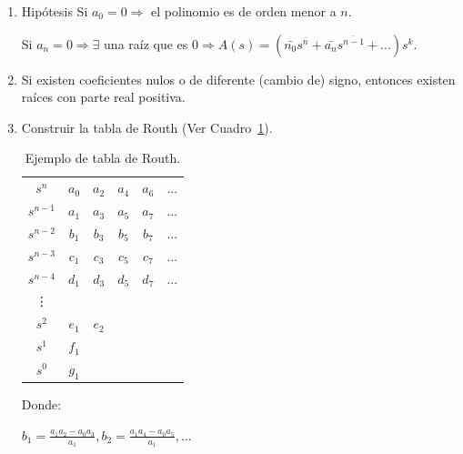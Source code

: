         \begin{enumerate}
            \item Hipótesis
                Si \begin{math}a_0 = 0 \Rightarrow\end{math} el polinomio es de orden menor a \begin{math}n\end{math}.

                Si \begin{math}a_n = 0 \Rightarrow \exists\end{math} una raíz que es \begin{math}0 \Rightarrow A(s) = (\bar{n_0} s^{\bar{n}} + \bar{a_n} s^{\bar{n-1}} + ...) s^k \end{math}.

            \item Si existen coeficientes nulos o de diferente (cambio de) signo, entonces existen raíces con parte real positiva.
            \item Construir la tabla de Routh (Ver Cuadro~\ref{tab:Routh}).

            \begin{table}[htbp]
                \centering
                \begin{tabular}{c|c c c c c}
                    $s^n$     & $a_0$ & $a_2$ & $a_4$ & $a_6$ & ...\\
                    $s^{n-1}$ & $a_1$ & $a_3$ & $a_5$ & $a_7$ & ...\\
                    $s^{n-2}$ & $b_1$ & $b_3$ & $b_5$ & $b_7$ & ...\\
                    $s^{n-3}$ & $c_1$ & $c_3$ & $c_5$ & $c_7$ & ...\\
                    $s^{n-4}$ & $d_1$ & $d_3$ & $d_5$ & $d_7$ & ...\\
                    \vdots                                         \\
                    $s^2$ & $e_1$ & $e_2$                          \\
                    $s^1$ & $f_1$                                  \\
                    $s^0$ & $g_1$
                \end{tabular}
                \caption{\label{tab:Routh}Ejemplo de tabla de Routh.}
            \end{table}

            Donde:

            \begin{math}
            b_1 = \frac{a_1 a_2 - a_0 a_3}{a_1} , b_2 = \frac{a_1 a_4 - a_0 a_5}{a_1} , \dots
            \end{math}


\end{enumerate}
